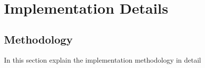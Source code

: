 \chapter{Implementation Details}
\section{Methodology}
In this section explain the implementation methodology in detail